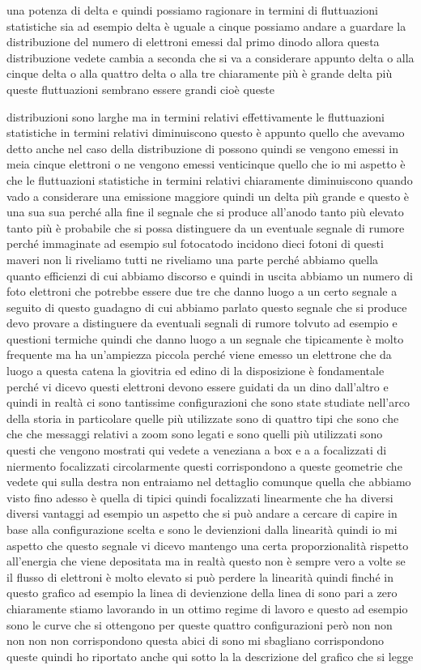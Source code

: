 {una potenza di delta e quindi possiamo ragionare in termini di fluttuazioni statistiche sia ad esempio delta è uguale a cinque possiamo andare a guardare la distribuzione del numero di elettroni emessi dal primo dinodo allora questa distribuzione vedete cambia a seconda che si va a considerare appunto delta o alla cinque delta o alla quattro delta o alla tre chiaramente più è grande delta più queste fluttuazioni sembrano essere grandi cioè queste 

distribuzioni sono larghe ma in termini relativi effettivamente le fluttuazioni statistiche in termini relativi diminuiscono questo è appunto quello che avevamo detto anche nel caso della distribuzione di possono quindi se vengono emessi in meia cinque elettroni o ne vengono emessi venticinque quello che io mi aspetto è che le fluttuazioni statistiche in termini relativi chiaramente diminuiscono quando vado a considerare una emissione maggiore quindi un delta più grande e questo è una sua sua perché alla fine il segnale che si produce all'anodo tanto più elevato tanto più è probabile che si possa distinguere da un eventuale segnale di rumore perché immaginate ad esempio sul fotocatodo incidono dieci fotoni di questi maveri non li riveliamo tutti ne riveliamo una parte perché abbiamo quella quanto efficienzi di cui abbiamo discorso e quindi in uscita abbiamo un numero di foto elettroni che potrebbe essere due tre che danno luogo a un certo segnale a seguito di questo guadagno di cui abbiamo parlato questo segnale che si produce devo provare a distinguere da eventuali segnali di rumore tolvuto ad esempio e questioni termiche quindi che danno luogo a un segnale che tipicamente è molto frequente ma ha un'ampiezza piccola perché viene emesso un elettrone che da luogo a questa catena la giovitria ed edino di la disposizione è fondamentale perché vi dicevo questi elettroni devono essere guidati da un dino dall'altro e quindi in realtà ci sono tantissime configurazioni che sono state studiate nell'arco della storia in particolare quelle più utilizzate sono di quattro tipi che sono che che che messaggi relativi a zoom sono legati e sono quelli più utilizzati sono questi che vengono mostrati qui vedete a veneziana a box e a a focalizzati di niermento focalizzati circolarmente questi corrispondono a queste geometrie che vedete qui sulla destra non entraiamo nel dettaglio comunque quella che abbiamo visto fino adesso è quella di tipici quindi focalizzati linearmente che ha diversi diversi vantaggi ad esempio un aspetto che si può andare a cercare di capire in base alla configurazione scelta e sono le devienzioni dalla linearità quindi io mi aspetto che questo segnale vi dicevo mantengo una certa proporzionalità rispetto all'energia che viene depositata ma in realtà questo non è sempre vero a volte se il flusso di elettroni è molto elevato si può perdere la linearità quindi finché in questo grafico ad esempio la linea di devienzione della linea di sono pari a zero chiaramente stiamo lavorando in un ottimo regime di lavoro e questo ad esempio sono le curve che si ottengono per queste quattro configurazioni però non non non non non corrispondono questa abici di sono mi sbagliano corrispondono queste quindi ho riportato anche qui sotto la la descrizione del grafico che si legge }
